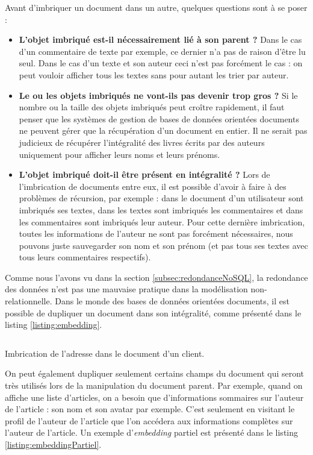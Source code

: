 	Avant d'imbriquer un document dans un autre, quelques questions sont à se poser :
	\vspace{10px}
	\begin{itemize}
		\item \textbf{L'objet imbriqué est-il nécessairement lié à son parent ?} Dans le cas d'un commentaire de texte par exemple, ce dernier n'a pas de raison d'être lu seul. Dans le cas d'un texte et son auteur ceci n'est pas forcément le cas : on peut vouloir afficher tous les textes sans pour autant les trier par auteur.
		\item \textbf{Le ou les objets imbriqués ne vont-ils pas devenir trop gros ?} Si le nombre ou la taille des objets imbriqués peut croître rapidement, il faut penser que les systèmes de gestion de bases de données orientées documents ne peuvent gérer que la récupération d'un document en entier. Il ne serait pas judicieux de récupérer l'intégralité des livres écrits par des auteurs uniquement pour afficher leurs noms et leurs prénoms.
		\item \textbf{L'objet imbriqué doit-il être présent en intégralité ?} Lors de l'imbrication de documents entre eux, il est possible d'avoir à faire à des problèmes de récursion, par exemple : dans le document d'un utilisateur sont imbriqués ses textes, dans les textes sont imbriqués les commentaires et dans les commentaires sont imbriqués leur auteur. Pour cette dernière imbrication, toutes les informations de l'auteur ne sont pas forcément nécessaires, nous pouvons juste sauvegarder son nom et son prénom (et pas tous ses textes avec tous leurs commentaires respectifs).
	\end{itemize}
	\vspace{20px}

	Comme nous l'avons vu dans la section \ref{subsec:redondanceNoSQL}, la redondance des données n'est pas une mauvaise pratique dans la modélisation non-relationnelle. Dans le monde des bases de données orientées documents, il est possible de dupliquer un document dans son intégralité, comme présenté dans le listing \ref{listing:embedding}. 
	\begin{listing}[H]
		\inputminted{json}{code/imbrication.json}
		\caption{Imbrication de l'adresse dans le document d'un client.}
		\label{listing:embedding}
	\end{listing}

	On peut également dupliquer seulement certains champs du document qui seront très utilisés lors de la manipulation du document parent. Par exemple, quand on affiche une liste d'articles, on a besoin que d'informations sommaires sur l'auteur de l'article : son nom et son avatar par exemple. C'est seulement en visitant le profil de l'auteur de l'article que l'on accédera aux informations complètes sur l'auteur de l'article. Un exemple d'\textit{embedding} partiel est présenté dans le listing \ref{listing:embeddingPartiel}.

